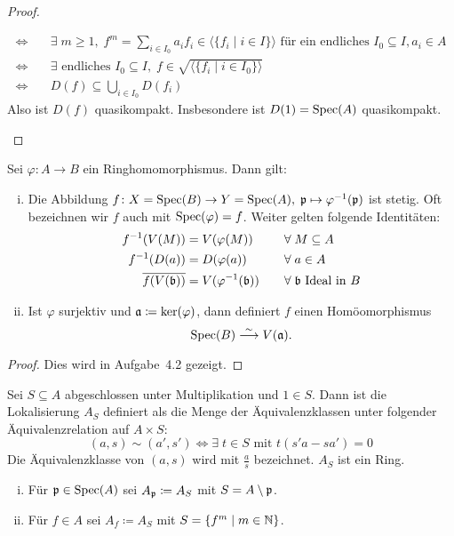 \begin{prop}
\begin{proof}
\begin{enumerate}[i)]
\begin{align*}
				\Longleftrightarrow \quad & \exists\; m \ge 1,\; f^m = \sum_{i\in I_0} a_i f_i \in \langle \{f_i \mid i \in I\}\rangle \text{ für ein endliches }I_0 \subseteq I, a_i \in A\\
				\Longleftrightarrow \quad & \exists \text{ endliches } I_0 \subseteq I,\; f \in \sqrt{\langle\{f_i\mid i \in I_0\}\rangle}\\
				\Longleftrightarrow \quad & D(f) \subseteq \bigcup_{i \in I_0} D(f_i)
			\end{align*}
			Also ist $D(f)$ quasikompakt. Insbesondere ist $D(1) = \operatorname{Spec}(A)$ quasikompakt.
		\end{enumerate}
	\end{proof}
\end{prop}

\begin{prop}
\label{prop:4.9}
	Sei $\varphi\colon A \to B$ ein Ringhomomorphismus. Dann gilt:
	\begin{enumerate}[i)]
		\item Die Abbildung $f\colon X = \operatorname{Spec}(B) \to Y = \operatorname{Spec}(A),\; \mathfrak{p} \mapsto \varphi^{-1}(\mathfrak{p})$ ist stetig. Oft bezeichnen wir $f$ auch mit $\operatorname{Spec}(\varphi) = f$. Weiter gelten folgende Identitäten:
		\begin{alignat*}{2}
			f^{-1}(V(M)) &= V(\varphi(M)) \quad &&\forall \;M \subseteq A\\
			f^{-1}(D(a)) &= D(\varphi(a)) \quad &&\forall \;a \in A\\
			\overline{f(V(\mathfrak{b}))} &= V(\varphi^{-1}(\mathfrak{b})) \quad &&\forall\; \mathfrak{b} \text{ Ideal in } B
		\end{alignat*}
		\item Ist $\varphi$ surjektiv und $\mathfrak{a} \coloneqq \ker(\varphi)$, dann definiert $f$ einen Homöomorphismus
		\[
			\operatorname{Spec}(B) \overset{\sim}{\longrightarrow} V(\mathfrak{a}).
		\]
	\end{enumerate}
	
	\begin{proof}
		Dies wird in Aufgabe~4.2 gezeigt.
	\end{proof}
\end{prop}

\begin{eri}
	Sei $S \subseteq A$ abgeschlossen unter Multiplikation und $1 \in S$. Dann ist die Lokalisierung $A_S$ definiert als die Menge der Äquivalenzklassen unter folgender Äquivalenzrelation auf $A \times S$:
	\[
		(a,s)\sim(a',s') \Longleftrightarrow \exists\; t \in S \text{ mit } t(s'a-sa') = 0
	\]
	Die Äquivalenzklasse von $(a,s)$ wird mit $\frac{a}{s}$ bezeichnet. $A_S$ ist ein Ring.
	\begin{enumerate}[i)]
		\item Für $\mathfrak{p} \in \operatorname{Spec}(A)$ sei $A_{\mathfrak{p}}\coloneqq A_S$ mit $S=A\setminus \mathfrak{p}$.
		\item Für $f \in A$ sei $A_f \coloneqq A_S$ mit $S = \{f^m \mid m \in \mathbb {N} \}$.
	\end{enumerate}
\end{eri}

